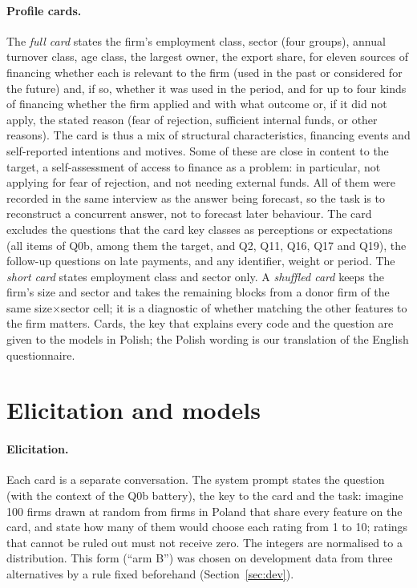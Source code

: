 \documentclass[11pt]{article}
\begin{document}
\paragraph{Profile cards.} The \emph{full card} states the firm's employment class, sector (four groups), annual
turnover class, age class, the largest owner, the export share, for eleven sources of financing whether each is
relevant to the firm (used in the past or considered for the future) and, if so, whether it was used in the
period, and for up to four kinds of financing whether the firm applied and with what outcome or, if it did not
apply, the stated reason (fear of rejection, sufficient internal funds, or other reasons). The card is thus a mix of
structural characteristics, financing events and self-reported intentions and motives. Some of these are close in
content to the target, a self-assessment of access to finance as a problem: in particular, not applying for fear of
rejection, and not needing external funds. All of them were recorded in the same interview as the answer being
forecast, so the task is to reconstruct a concurrent answer, not to forecast later behaviour. The card excludes the
questions that the card key classes as perceptions or expectations (all items of Q0b, among them the target, and
Q2, Q11, Q16, Q17 and Q19), the follow-up questions on late payments, and any identifier, weight or period. The \emph{short card} states employment class
and sector only. A \emph{shuffled card} keeps the firm's size and sector and takes the remaining blocks from a donor
firm of the same size$\times$sector cell; it is a diagnostic of whether matching the other features to the firm
matters. Cards, the key that explains every code and the question are given to the models in Polish; the Polish
wording is our translation of the English questionnaire.

\section{Elicitation and models}

\paragraph{Elicitation.} Each card is a separate conversation. The system prompt states the question (with the
context of the Q0b battery), the key to the card and the task: imagine 100 firms drawn at random from firms in Poland
that share every feature on the card, and state how many of them would choose each rating from 1 to 10; ratings that
cannot be ruled out must not receive zero. The integers are normalised to a distribution. This form (``arm B'') was
chosen on development data from three alternatives by a rule fixed beforehand (Section~\ref{sec:dev}).
\end{document}
